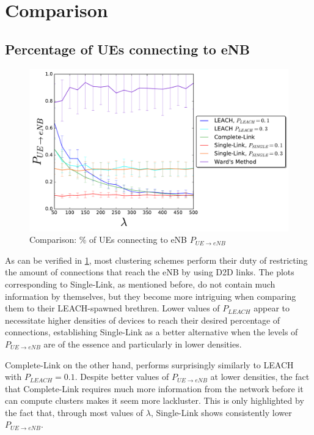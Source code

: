 \clearpage

\section{Comparison}\label{Comparison}
\subsection{Percentage of UEs connecting to eNB}
\begin{figure}[H]
\centering
\captionsetup{justification=centering}
\includegraphics[width=1\linewidth]{figures/COMPARE_2}
\caption{Comparison: \% of UEs connecting to eNB $P_{UE\rightarrow eNB}$ }
\label{fig:COMPARE_2}
\end{figure}

As can be verified in \ref{fig:COMPARE_2}, most clustering schemes perform their duty of restricting the amount of connections that reach the eNB by using D2D links. The plots corresponding to Single-Link, as mentioned before, do not contain much information by themselves, but they become more intriguing when comparing them to their LEACH-spawned brethren. Lower values of $P_{LEACH}$ appear to necessitate higher densities of devices to reach their desired percentage of connections, establishing Single-Link as a better alternative when the levels of $P_{UE\rightarrow eNB}$ are of the essence and particularly in lower densities.

Complete-Link on the other hand, performs surprisingly similarly to LEACH with $P_{LEACH} = 0.1$. Despite better values of $P_{UE\rightarrow eNB}$ at lower densities, the fact that Complete-Link requires much more information from the network before it can compute clusters makes it seem more lackluster. This is only highlighted by the fact that, through most values of $\lambda$, Single-Link shows consistently lower $P_{UE\rightarrow eNB}$.

